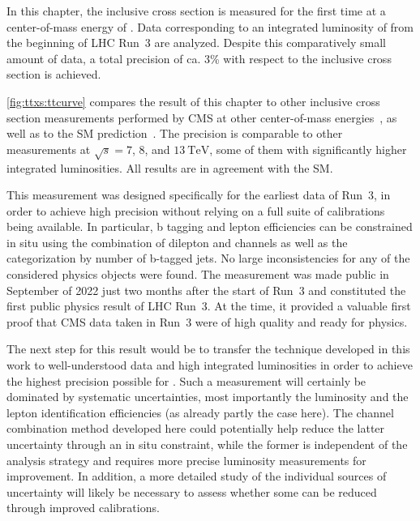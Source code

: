 In this chapter, the inclusive \ttbar cross section is measured for the first time at a center-of-mass energy of \sqrtsRIII. Data corresponding to an integrated luminosity of \lumiRIII from the beginning of LHC Run~3 are analyzed. Despite this comparatively small amount of data, a total precision of ca. 3\% with respect to the inclusive cross section is achieved.

\cref{fig:ttxs:ttcurve} compares the result of this chapter to other inclusive \ttbar cross section measurements performed by CMS at other center-of-mass energies~\cite{CMS:TOP-17-001, CMS:TOP-11-007, CMS:TOP-14-018, CMS:TOP-12-006, CMS:TOP-13-004, CMS:TOP-18-005, CMS:TOP-20-001, CMS:TOP-20-004}, as well as to the SM prediction~\cite{Czakon:2013goa}. The precision is comparable to other measurements at $\sqrt{s} = 7$, $8$, and $\SI{13}{\TeV}$, some of them with significantly higher integrated luminosities. All results are in agreement with the SM.

This measurement was designed specifically for the earliest data of Run~3, in order to achieve high precision without relying on a full suite of calibrations being available. In particular, b tagging and lepton efficiencies can be constrained in situ using the combination of dilepton and \ljets channels as well as the categorization by number of b-tagged jets. No large inconsistencies for any of the considered physics objects were found. The measurement was made public in September of 2022 just two months after the start of Run~3 and constituted the first public physics result of LHC Run~3. At the time, it provided a valuable first proof that CMS data taken in Run~3 were of high quality and ready for physics.

The next step for this result would be to transfer the technique developed in this work to well-understood data and high integrated luminosities in order to achieve the highest precision possible for \sigmatt. Such a measurement will certainly be dominated by systematic uncertainties, most importantly the luminosity and the lepton identification efficiencies (as already partly the case here). 
The channel combination method developed here could potentially help reduce the latter uncertainty through an in situ constraint, while the former is independent of the analysis strategy and requires more precise luminosity measurements for improvement. In addition, a more detailed study of the individual sources of uncertainty will likely be necessary to assess whether some can be reduced through improved calibrations.

